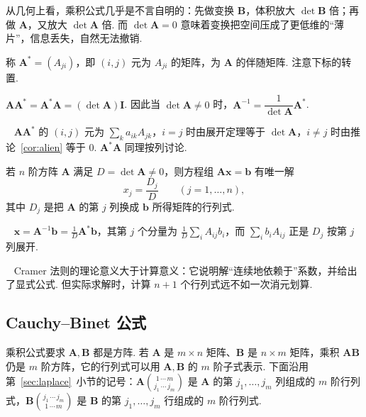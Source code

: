 \documentclass[lang=cn,10.5pt,scheme=chinese,toc=twocol,section,chinesefont=nofont,
twoside,citestyle=gb7714-2015,bibstyle=gb7714-2015]{elegantbook}
\DeclareRobustCommand{\textbf}[1]{{\lnsemiboldlatin\lnsemiboldcjk #1}}
\newcommand{\vv}[1]{\boldsymbol{#1}}
\numberwithin{equation}{section}   %
\newcommand*{\lnlabel}[1]{{\sffamily\bfseries\color{black}#1}}
\renewenvironment{proof}{%
	\par\noindent\lnlabel{\proofname}\;\ \color{black!90}\cfs}{\par}
\renewenvironment{remark}{\noindent\lnlabel{\remarkname}\ }{\par}
\begin{document}
\begin{motivebox}
  从几何上看，乘积公式几乎是不言自明的：先做变换 $\vv B$，体积放大 $\det\vv B$ 倍；再做 $\vv A$，又放大 $\det\vv A$ 倍. 而 $\det\vv A=0$ 意味着变换把空间压成了更低维的“薄片”，信息丢失，自然无法撤销.
\end{motivebox}

\begin{definition}
  称 $\vv A^*=(A_{ji})$，即 $(i,j)$ 元为 $A_{ji}$ 的矩阵，为 $\vv A$ 的\textbf{伴随矩阵}. 注意下标的转置.
\end{definition}

\begin{theorem}
  $\vv{AA}^*=\vv A^*\vv A=(\det\vv A)\vv I$. 因此当 $\det\vv A\ne0$ 时，$\vv A^{-1}=\dfrac{1}{\det\vv A}\vv A^*$.
\end{theorem}
\begin{proof}
  $\vv{AA}^*$ 的 $(i,j)$ 元为 $\sum_k a_{ik}A_{jk}$，$i=j$ 时由展开定理等于 $\det\vv A$，$i\ne j$ 时由推论~\ref{cor:alien} 等于 $0$. $\vv A^*\vv A$ 同理按列讨论.
\end{proof}

\begin{theorem}[Cramer 法则]
  若 $n$ 阶方阵 $\vv A$ 满足 $D=\det\vv A\ne0$，则方程组 $\vv{Ax}=\vv b$ 有唯一解
  \[
    x_j=\frac{D_j}{D}\qquad(j=1,\ldots,n),
  \]
  其中 $D_j$ 是把 $\vv A$ 的第 $j$ 列换成 $\vv b$ 所得矩阵的行列式.
\end{theorem}
\begin{proof}
  $\vv x=\vv A^{-1}\vv b=\frac1D\vv A^*\vv b$，其第 $j$ 个分量为 $\frac1D\sum_i A_{ij}b_i$，而 $\sum_i b_iA_{ij}$ 正是 $D_j$ 按第 $j$ 列展开.
\end{proof}

\begin{remark}
  Cramer 法则的理论意义大于计算意义：它说明解“连续地依赖于”系数，并给出了显式公式. 但实际求解时，计算 $n+1$ 个行列式远不如一次消元划算.
\end{remark}

\subsection{Cauchy–Binet 公式}

乘积公式要求 $\vv A,\vv B$ 都是方阵. 若 $\vv A$ 是 $m\times n$ 矩阵、$\vv B$ 是 $n\times m$ 矩阵，乘积 $\vv{AB}$ 仍是 $m$ 阶方阵，它的行列式可以用 $\vv A,\vv B$ 的 $m$ 阶子式表示. 下面沿用第~\ref{sec:laplace}~小节的记号：$\vv A\binom{1\,\cdots\,m}{j_1\,\cdots\,j_m}$ 是 $\vv A$ 的第 $j_1,\ldots,j_m$ 列组成的 $m$ 阶行列式，$\vv B\binom{j_1\,\cdots\,j_m}{1\,\cdots\,m}$ 是 $\vv B$ 的第 $j_1,\ldots,j_m$ 行组成的 $m$ 阶行列式.
\end{document}
